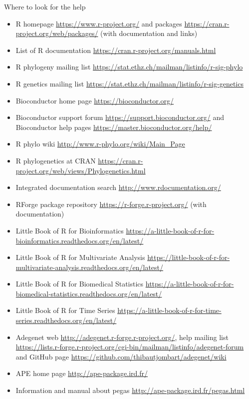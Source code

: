 \documentclass[compress, ucs, xelatex, 11pt, xcolor=svgnames,
  hyperref={
    bookmarks=true,
    unicode=true,
    colorlinks=true,
    pdftitle={Molecular data in R},
    plainpages=false,
    pdfauthor={Vojtech Zeisek},
    pdfsubject={Course about phylogeny and evolution in R},
    pdfcreator={XeLaTeX},
    pdfkeywords={R, evolution, phylogeny, molecular data},
    linkcolor=Tomato,
    anchorcolor=SaddleBrown,
    citecolor=Goldenrod,
    filecolor=DarkMagenta,
    menucolor=Sienna,
    urlcolor=DarkTurquoise,
    pdftex},
  url={hyphens, lowtilde} %
  ]{beamer}
\begin{document}
\begin{frame}[allowframebreaks]{Where to look for the help}
  \begin{itemize}
    \item R homepage \url{https://www.r-project.org/} and packages \url{https://cran.r-project.org/web/packages/} (with documentation and links)
    \item List of R documentation \url{https://cran.r-project.org/manuals.html}
    \item R phylogeny mailing list \url{https://stat.ethz.ch/mailman/listinfo/r-sig-phylo}
    \item R genetics mailing list \url{https://stat.ethz.ch/mailman/listinfo/r-sig-genetics}
    \item Bioconductor home page \url{https://bioconductor.org/}
    \item Bioconductor support forum \url{https://support.bioconductor.org/} and Bioconductor help pages \url{https://master.bioconductor.org/help/}
    \item R phylo wiki \url{http://www.r-phylo.org/wiki/Main_Page}
    \item R phylogenetics at CRAN \url{https://cran.r-project.org/web/views/Phylogenetics.html}
    \item Integrated documentation search \url{http://www.rdocumentation.org/}
    \item RForge package repository \url{https://r-forge.r-project.org/} (with documentation)
    \item Little Book of R for Bioinformatics \url{https://a-little-book-of-r-for-bioinformatics.readthedocs.org/en/latest/}
    \item Little Book of R for Multivariate Analysis \url{https://little-book-of-r-for-multivariate-analysis.readthedocs.org/en/latest/}
    \item Little Book of R for Biomedical Statistics \url{https://a-little-book-of-r-for-biomedical-statistics.readthedocs.org/en/latest/}
    \item Little Book of R for Time Series \url{https://a-little-book-of-r-for-time-series.readthedocs.org/en/latest/}
    \item Adegenet web \url{http://adegenet.r-forge.r-project.org/}, help mailing list \url{https://lists.r-forge.r-project.org/cgi-bin/mailman/listinfo/adegenet-forum} and GitHub page \url{https://github.com/thibautjombart/adegenet/wiki}
    \item APE home page \url{http://ape-package.ird.fr/}
    \item Information and manual about pegas \url{http://ape-package.ird.fr/pegas.html}

\end{itemize}
\end{frame}
\end{document}
